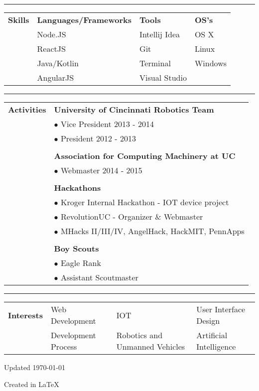 \documentclass[11pt]{article} %
\begin{document}
\begin{small}
\begin{tabular}[t]{p{3cm} p{16cm}}
			\end{tabular}
			\vspace*{.75\baselineskip}\hrule\vspace*{1\baselineskip}
			\begin{tabular}[t]{p{3cm}p{4cm}p{5cm}p{4cm}}\large{\textbf{Skills}} 	
				& \textbf{Languages/Frameworks}	& \textbf{Tools}& \textbf{OS's} 			\\ 
				& Node.JS				& Intellij Idea 		        & OS X 			\\
				& ReactJS				& Git					& Linux	  		\\
				& Java/Kotlin				& Terminal			& Windows	 	\\
				& AngularJS				& Visual Studio		 	& 				\\
				
			\end{tabular}
			\vspace*{.75\baselineskip}\hrule\vspace*{1\baselineskip}		
			\begin{tabular}[t]{p{3cm} p{16cm}}\large{\textbf{Activities}}
					& \textbf{University of Cincinnati Robotics Team}			\\
					& $\bullet$ Vice President 2013 - 2014					\\
					& $\bullet$ President 2012 - 2013						\\
					& \\
					& \textbf{Association for Computing Machinery at UC}		\\
					& $\bullet$ Webmaster 2014 - 2015 						\\
					& \\
					& \textbf{Hackathons} 								\\
					& $\bullet$ Kroger Internal Hackathon - IOT device project		\\ 
					& $\bullet$ RevolutionUC - Organizer \& Webmaster 			\\
					& $\bullet$ MHacks II/III/IV, AngelHack, HackMIT, PennApps 	\\
					& \\
					& \textbf{Boy Scouts} 								\\
					& $\bullet$ Eagle Rank								\\
					& $\bullet$ Assistant Scoutmaster						\\	
			\end{tabular}
			\vspace*{.75\baselineskip}\hrule\vspace*{1\baselineskip}
			\begin{tabular}[t]{p{3cm} p{4cm}p{5cm}p{5cm}}\large{\textbf{Interests}}
				& Web Development		& IOT	& User Interface Design 	\\
				& Development Process    & Robotics and Unmanned Vehicles					& Artificial Intelligence 	\\
			\end{tabular}

			\vspace*{2\baselineskip}
			\centerline{\scriptsize{Updated \today}}
			\centerline{\scriptsize{Created in \LaTeX}}
		\end{small}
\end{document}
